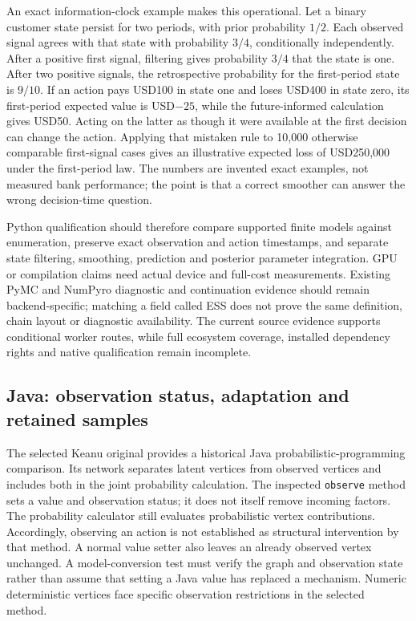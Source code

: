 An exact information-clock example makes this operational. Let a binary customer state persist for two periods, with prior probability $1/2$. Each observed signal agrees with that state with probability $3/4$, conditionally independently. After a positive first signal, filtering gives probability $3/4$ that the state is one. After two positive signals, the retrospective probability for the first-period state is $9/10$. If an action pays USD100 in state one and loses USD400 in state zero, its first-period expected value is USD$-25$, while the future-informed calculation gives USD50. Acting on the latter as though it were available at the first decision can change the action. Applying that mistaken rule to 10,000 otherwise comparable first-signal cases gives an illustrative expected loss of USD250,000 under the first-period law. The numbers are invented exact examples, not measured bank performance; the point is that a correct smoother can answer the wrong decision-time question.~\citep{exec25_bsw_choice}

Python qualification should therefore compare supported finite models against enumeration, preserve exact observation and action timestamps, and separate state filtering, smoothing, prediction and posterior parameter integration. GPU or compilation claims need actual device and full-cost measurements. Existing PyMC and NumPyro diagnostic and continuation evidence should remain backend-specific; matching a field called ESS does not prove the same definition, chain layout or diagnostic availability. The current source evidence supports conditional worker routes, while full ecosystem coverage, installed dependency rights and native qualification remain incomplete.~\citep{exec23_pymc_sources,exec23_numpyro_sources,exec25_bsw_choice}

\subsection{Java: observation status, adaptation and retained samples}

The selected Keanu original provides a historical Java probabilistic-programming comparison. Its network separates latent vertices from observed vertices and includes both in the joint probability calculation. The inspected \texttt{observe} method sets a value and observation status; it does not itself remove incoming factors. The probability calculator still evaluates probabilistic vertex contributions. Accordingly, observing an action is not established as structural intervention by that method. A normal value setter also leaves an already observed vertex unchanged. A model-conversion test must verify the graph and observation state rather than assume that setting a Java value has replaced a mechanism. Numeric deterministic vertices face specific observation restrictions in the selected method.~\citep{exec25_bsw_keanu}

